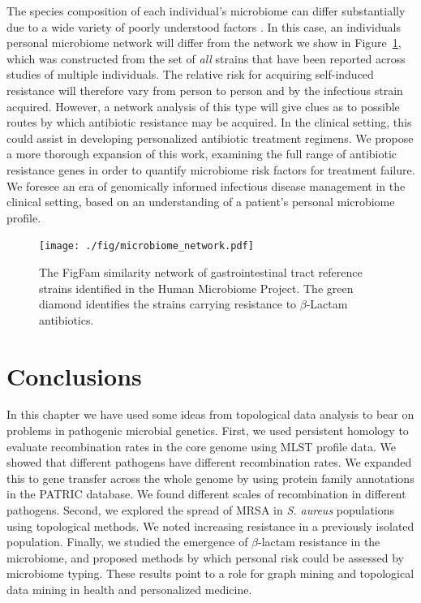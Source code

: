 The species composition of each individual's microbiome can differ substantially due to a wide variety of poorly understood factors \cite{Consortium:2012bm}.
In this case, an individuals personal microbiome network will differ from the network we show in Figure~\ref{fig:microbiome_network}, which was constructed from the set of \emph{all} strains that have been reported across studies of multiple individuals.
The relative risk for acquiring self-induced resistance will therefore vary from person to person and by the infectious strain acquired.
However, a network analysis of this type will give clues as to possible routes by which antibiotic resistance may be acquired.
In the clinical setting, this could assist in developing personalized antibiotic treatment regimens.
We propose a more thorough expansion of this work, examining the full range of antibiotic resistance genes in order to quantify microbiome risk factors for treatment failure.
We foresee an era of genomically informed infectious disease management in the clinical setting, based on an understanding of a patient's personal microbiome profile.

\begin{figure}[t]
\centering
\texttt{[image: ./fig/microbiome\_network.pdf]}
\caption{The FigFam similarity network of gastrointestinal tract reference strains identified in the Human Microbiome Project. The green diamond identifies the strains carrying resistance to $\beta$-Lactam antibiotics.}
\label{fig:microbiome_network}
\end{figure}

\section{Conclusions}

In this chapter we have used some ideas from topological data analysis to bear on problems in pathogenic microbial genetics.
First, we used persistent homology to evaluate recombination rates in the core genome using MLST profile data.
We showed that different pathogens have different recombination rates.
We expanded this to gene transfer across the whole genome by using protein family annotations in the PATRIC database.
We found different scales of recombination in different pathogens.
Second, we explored the spread of MRSA in \emph{S. aureus} populations using topological methods.
We noted increasing resistance in a previously isolated population.
Finally, we studied the emergence of $\beta$-lactam resistance in the microbiome, and proposed methods by which personal risk could be assessed by microbiome typing.
These results point to a role for graph mining and topological data mining in health and personalized medicine.